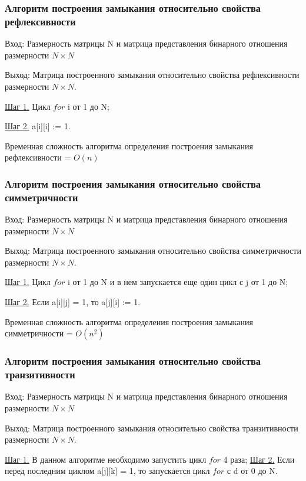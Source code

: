 \documentclass[bachelor, och, labwork]{shiza}
\begin{document}
	\subsubsection{Алгоритм построения замыкания относительно свойства рефлексивности}
	
	$\textit{Вход:}$ Размерность матрицы N и матрица представления бинарного отношения размерности $N \times N$
	
	$\textit{Выход:}$  Матрица построенного замыкания относительно свойства рефлексивности размерности $N \times N$.
	
	\underline{Шаг 1.} Цикл $for$ i от 1 до N;
	
	\underline{Шаг 2.} a[i][i] := 1.
	
	Временная сложность алгоритма определения построения замыкания рефлексивности = $O(n)$
	
	
	\subsubsection{Алгоритм построения замыкания относительно свойства симметричности}

	$\textit{Вход:}$ Размерность матрицы N и матрица представления бинарного отношения размерности $N \times N$
	
	$\textit{Выход:}$  Матрица построенного замыкания относительно свойства симметричности размерности $N \times N$.
	
	\underline{Шаг 1.} Цикл $for$ i от 1 до N и в нем запускается еще один цикл с j от 1 до N;
		
	\underline{Шаг 2.} Если a[i][j] = 1, то a[j][i] := 1.
	
	Временная сложность алгоритма определения построения замыкания симметричности = $O(n^2)$
	
	\subsubsection{Алгоритм построения замыкания относительно свойства транзитивности}

	$\textit{Вход:}$ Размерность матрицы N и матрица представления бинарного отношения размерности $N \times N$
	
	$\textit{Выход:}$  Матрица построенного замыкания относительно свойства транзитивности размерности $N \times N$.
	
	\underline{Шаг 1.} В данном алгоритме необходимо запустить цикл $for$ 4 раза;
	\underline{Шаг 2.} Если перед последним циклом a[j][k] = 1, то запускается цикл $for$ с d от 0 до N.
	
\end{document}
